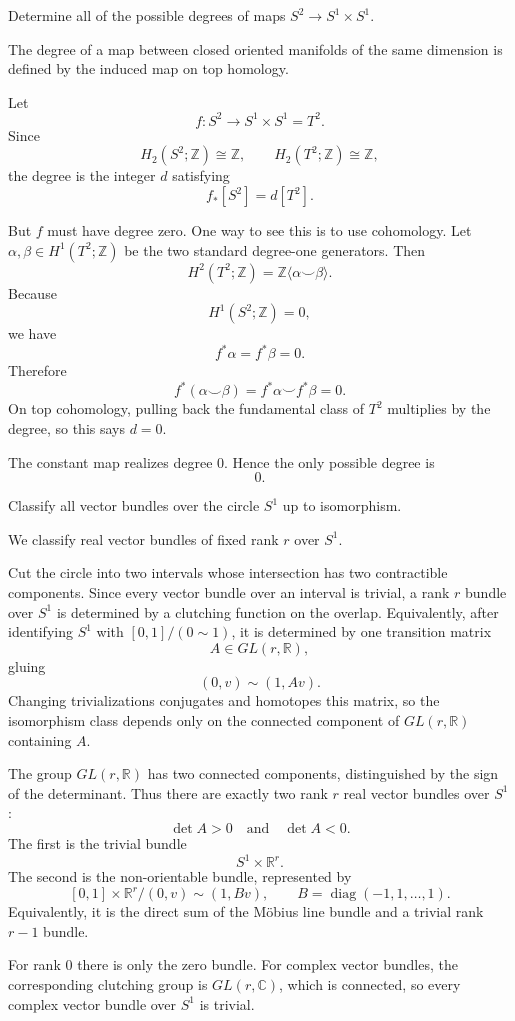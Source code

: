 \begin{exercise}
\label{geometry:2018:2}
Determine all of the possible degrees of maps $S^2 \to S^1 \times S^1$.
\end{exercise}

\begin{solution}
The degree of a map between closed oriented manifolds of the same dimension is defined by the induced map on top homology.

Let
\[
f:S^2\to S^1\times S^1=T^2.
\]
Since
\[
H_2(S^2;\mathbb{Z})\cong \mathbb{Z},
\qquad
H_2(T^2;\mathbb{Z})\cong \mathbb{Z},
\]
the degree is the integer $d$ satisfying
\[
f_*[S^2]=d[T^2].
\]

But $f$ must have degree zero. One way to see this is to use cohomology. Let $\alpha,\beta\in H^1(T^2;\mathbb{Z})$ be the two standard degree-one generators. Then
\[
H^2(T^2;\mathbb{Z})=\mathbb{Z}\langle \alpha\smile\beta\rangle.
\]
Because
\[
H^1(S^2;\mathbb{Z})=0,
\]
we have
\[
f^*\alpha=f^*\beta=0.
\]
Therefore
\[
f^*(\alpha\smile\beta)=f^*\alpha\smile f^*\beta=0.
\]
On top cohomology, pulling back the fundamental class of $T^2$ multiplies by the degree, so this says $d=0$.

The constant map realizes degree $0$. Hence the only possible degree is
\[
0.
\]
\end{solution}

\begin{exercise}
\label{geometry:2018:3}
Classify all vector bundles over the circle $S^1$ up to isomorphism.
\end{exercise}

\begin{solution}
We classify real vector bundles of fixed rank $r$ over $S^1$.

Cut the circle into two intervals whose intersection has two contractible components. Since every vector bundle over an interval is trivial, a rank $r$ bundle over $S^1$ is determined by a clutching function on the overlap. Equivalently, after identifying $S^1$ with $[0,1]/(0\sim 1)$, it is determined by one transition matrix
\[
A\in GL(r,\mathbb{R}),
\]
gluing
\[
(0,v)\sim (1,Av).
\]
Changing trivializations conjugates and homotopes this matrix, so the isomorphism class depends only on the connected component of $GL(r,\mathbb{R})$ containing $A$.

The group $GL(r,\mathbb{R})$ has two connected components, distinguished by the sign of the determinant. Thus there are exactly two rank $r$ real vector bundles over $S^1$:
\[
\det A>0
\quad\text{and}\quad
\det A<0.
\]
The first is the trivial bundle
\[
S^1\times \mathbb{R}^r.
\]
The second is the non-orientable bundle, represented by
\[
[0,1]\times \mathbb{R}^r /(0,v)\sim (1,Bv),
\qquad
B=\operatorname{diag}(-1,1,\dots,1).
\]
Equivalently, it is the direct sum of the Möbius line bundle and a trivial rank $r-1$ bundle.

For rank $0$ there is only the zero bundle. For complex vector bundles, the corresponding clutching group is $GL(r,\mathbb{C})$, which is connected, so every complex vector bundle over $S^1$ is trivial.
\end{solution}

